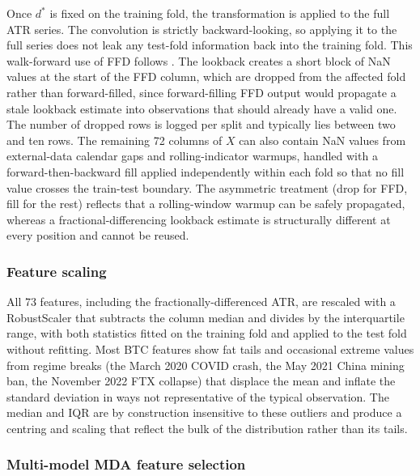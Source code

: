\documentclass[12pt,a4paper,oneside]{article}
\begin{document}
Once $d^{\ast}$ is fixed on the training fold, the transformation is applied to the full ATR series. The convolution is strictly backward-looking, so applying it to the full series does not leak any test-fold information back into the training fold. This walk-forward use of FFD follows \citet{slepaczuk_bieganowski_2024}. The lookback creates a short block of NaN values at the start of the FFD column, which are dropped from the affected fold rather than forward-filled, since forward-filling FFD output would propagate a stale lookback estimate into observations that should already have a valid one. The number of dropped rows is logged per split and typically lies between two and ten rows. The remaining 72 columns of $X$ can also contain NaN values from external-data calendar gaps and rolling-indicator warmups, handled with a forward-then-backward fill applied independently within each fold so that no fill value crosses the train-test boundary. The asymmetric treatment (drop for FFD, fill for the rest) reflects that a rolling-window warmup can be safely propagated, whereas a fractional-differencing lookback estimate is structurally different at every position and cannot be reused.


\subsubsection{Feature scaling}\label{subsubsec:scaling}

All 73 features, including the fractionally-differenced ATR, are rescaled with a RobustScaler that subtracts the column median and divides by the interquartile range, with both statistics fitted on the training fold and applied to the test fold without refitting. Most BTC features show fat tails and occasional extreme values from regime breaks (the March 2020 COVID crash, the May 2021 China mining ban, the November 2022 FTX collapse) that displace the mean and inflate the standard deviation in ways not representative of the typical observation. The median and IQR are by construction insensitive to these outliers and produce a centring and scaling that reflect the bulk of the distribution rather than its tails.


\subsubsection{Multi-model MDA feature selection}\label{subsubsec:mda}
\end{document}
